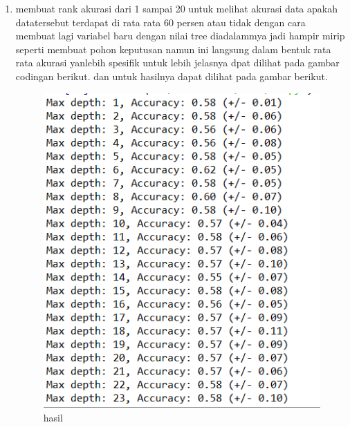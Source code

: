 \begin{enumerate}
\item membuat rank akurasi dari 1 sampai 20 untuk melihat akurasi data apakah datatersebut terdapat di rata rata 60 persen atau tidak dengan cara membuat lagi variabel baru dengan nilai tree diadalammya jadi hampir mirip seperti membuat pohon keputusan namun ini langsung dalam bentuk rata rata akurasi yanlebih spesifik untuk lebih jelasnya dpat dilihat pada gambar codingan berikut. dan untuk hasilnya dapat dilihat pada gambar berikut.

\begin{figure}[ht]
\centering
\includegraphics[scale=0.5]{figures/1174050/chapter2/19.PNG}
\caption{hasil}
\label{contoh}
\end{figure}


\end{enumerate}

